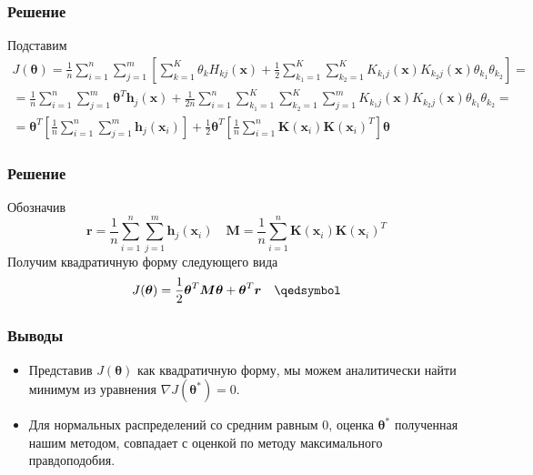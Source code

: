\documentclass{beamer}
\begin{document}
\begin{frame}
    \frametitle{Решение}
    Подставим
    \begin{multline}
        J(\boldsymbol{\theta}) = \frac{1}{n} \sum_{i=1}^n \sum_{j=1}^m \left[ \sum_{k=1}^K \theta_k H_{kj}(\boldsymbol{x}) + \frac{1}{2} \sum_{k_1=1}^K \sum_{k_2=1}^K K_{k_1j}(\boldsymbol{x}) K_{k_2j}(\boldsymbol{x}) \theta_{k_1} \theta_{k_2} \right] = \\ =
         \frac{1}{n} \sum_{i=1}^n \sum_{j=1}^m \boldsymbol{\theta}^T \boldsymbol{h}_j(\boldsymbol{x}) + \frac{1}{2n} \sum_{i=1}^n \sum_{k_1=1}^K \sum_{k_2=1}^K \sum_{j=1}^m K_{k_1j}(\boldsymbol{x}) K_{k_2j}(\boldsymbol{x}) \theta_{k_1} \theta_{k_2} = \\ =
         \boldsymbol{\theta}^T \left[ \frac{1}{n} \sum_{i=1}^n \sum_{j=1}^m 
         \boldsymbol{h}_j(\boldsymbol{x}_i) \right]  + \frac{1}{2} \boldsymbol{\theta}^T \left[ \frac{1}{n} \sum_{i=1}^n \boldsymbol{K}(\boldsymbol{x}_i) \boldsymbol{K}(\boldsymbol{x}_i)^T \right] \boldsymbol{\theta}
    \end{multline}
\end{frame}


\begin{frame}
    \frametitle{Решение}
    Обозначив
    \begin{equation}
        \boldsymbol{r} = \frac{1}{n} \sum_{i=1}^n \sum_{j=1}^m 
         \boldsymbol{h}_j(\boldsymbol{x}_i) \quad \boldsymbol{M} = \frac{1}{n} \sum_{i=1}^n \boldsymbol{K}(\boldsymbol{x}_i) \boldsymbol{K}(\boldsymbol{x}_i)^T 
    \end{equation}
    Получим квадратичную форму следующего вида
    \begin{equation}
        J(\boldsymbol{\theta}) = \frac{1}{2} \boldsymbol{\theta}^T \boldsymbol{M} \boldsymbol{\theta} + \boldsymbol{\theta}^T \boldsymbol{r} \quad \qedsymbol
    \end{equation}
\end{frame}


\begin{frame}
    \frametitle{Выводы}
    \begin{itemize}
        \item Представив $J(\boldsymbol{\theta})$ как квадратичную форму, мы можем аналитически найти минимум из уравнения $\nabla J(\boldsymbol{\theta}^*) = 0$.
        \item Для нормальных распределений со средним равным 0, оценка $\boldsymbol{\theta}^*$ полученная нашим методом, совпадает с оценкой по методу максимального правдоподобия. 
    \end{itemize}
\end{frame}
\end{document}
